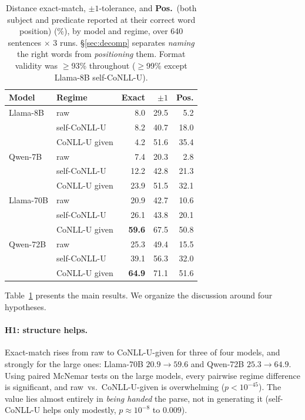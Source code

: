 \documentclass[11pt]{article}
\begin{document}
\begin{table}[t]
\centering\small
\setlength{\tabcolsep}{4pt}
\begin{tabular}{llrrr}
\toprule
\textbf{Model} & \textbf{Regime} & \textbf{Exact} & \textbf{$\pm1$} & \textbf{Pos.} \\
\midrule
Llama-8B  & raw          & 8.0  & 29.5 & 5.2  \\
          & self-CoNLL-U & 8.2  & 40.7 & 18.0 \\
          & CoNLL-U given& 4.2  & 51.6 & 35.4 \\
\addlinespace
Qwen-7B   & raw          & 7.4  & 20.3 & 2.8  \\
          & self-CoNLL-U & 12.2 & 42.8 & 21.3 \\
          & CoNLL-U given& 23.9 & 51.5 & 32.1 \\
\addlinespace
Llama-70B & raw          & 20.9 & 42.7 & 10.6 \\
          & self-CoNLL-U & 26.1 & 43.8 & 20.1 \\
          & CoNLL-U given& \textbf{59.6} & 67.5 & 50.8 \\
\addlinespace
Qwen-72B  & raw          & 25.3 & 49.4 & 15.5 \\
          & self-CoNLL-U & 39.1 & 56.3 & 32.0 \\
          & CoNLL-U given& \textbf{64.9} & 71.1 & 51.6 \\
\bottomrule
\end{tabular}
\caption{Distance exact-match, $\pm1$-tolerance, and \textbf{Pos.}\ (both subject and predicate
reported at their correct word position) (\%), by model and regime, over 640 sentences $\times$ 3
runs. \S\ref{sec:decomp} separates \emph{naming} the right words from \emph{positioning} them.
Format validity was $\geq$93\% throughout ($\geq$99\% except Llama-8B self-CoNLL-U).}
\label{tab:main}
\end{table}

Table~\ref{tab:main} presents the main results. We organize the discussion around four hypotheses.

\paragraph{H1: structure helps.} Exact-match rises from raw to CoNLL-U-given for three of four
models, and strongly for the large ones: Llama-70B $20.9\!\rightarrow\!59.6$ and Qwen-72B
$25.3\!\rightarrow\!64.9$. Using paired McNemar tests on the large models, every pairwise regime
difference is significant, and raw~vs.~CoNLL-U-given is overwhelming ($p<10^{-45}$). The value lies
almost entirely in \emph{being handed} the parse, not in generating it (self-CoNLL-U helps only
modestly, $p\approx10^{-8}$ to $0.009$).
\end{document}
